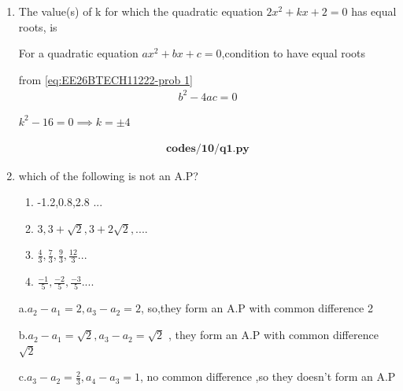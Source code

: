 \begin{enumerate}[label=\thesubsection.\arabic*, ref=\thesubsection.\theenumi]


    \item The value(s) of k for which the quadratic equation $2x^2 + kx + 2 = 0$ has equal roots, is
\begin{enumerate}
\end{enumerate}

\solution 

For a quadratic equation $ ax^2+bx+c=0$,condition to have equal roots 

from \eqref{eq:EE26BTECH11222-prob 1}
\begin{align}
b^2-4ac=0    
\end{align}

$k^2-16=0 \implies k=\pm 4$

\begin{align}
	\textbf{codes/10/q1.py}
\end{align}
   \item which of the following is not an A.P?
   \begin{enumerate}
   	

\item -1.2,0.8,2.8 ...

\item$3,3+\sqrt{2},3+2\sqrt{2},....$

\item$\frac{4}{3},\frac{7}{3},\frac{9}{3},\frac{12}{3}...$

\item$\frac{-1}{5},\frac{-2}{5},\frac{-3}{5}....$


\end{enumerate}
\solution 

a.$a_2-a_1= 2,a_3-a_2=2 $, so,they form an A.P with common difference 2

b.$a_2-a_1=\sqrt{2}, a_3-a_2=\sqrt{2}$ , they form an A.P with common difference $\sqrt{2}$

c.$a_3-a_2=\frac{2}{3},a_4-a_3=1$, no common difference ,so they doesn't form an A.P


\end{enumerate}

